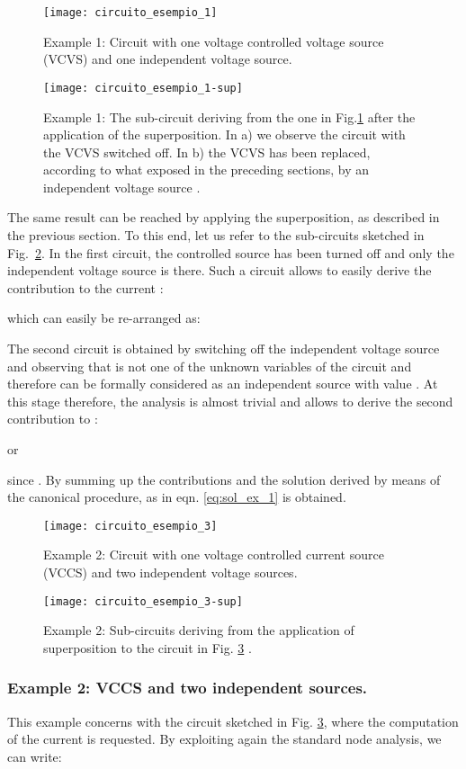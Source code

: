 \documentclass[10pt]{amsart}
\begin{document}
\begin{figure}[t]
\centering
\texttt{[image: circuito\_esempio\_1]}
\caption{Example 1: Circuit with one voltage controlled voltage source (VCVS) and one independent voltage source.}
\label{fig:VCVS}
\end{figure}
\begin{figure}[t]
\centering
\texttt{[image: circuito\_esempio\_1-sup]}
\caption{Example 1: The sub-circuit deriving from the one in Fig.\ref{fig:VCVS} after the application of the superposition. In a) we observe the circuit with the VCVS switched off. In b) the VCVS has been replaced, according to what exposed in the preceding sections, by an independent voltage source .}
\label{fig:VCVS-sub}
\end{figure}
The same result can be reached by applying the superposition, as described in the previous section. To this end, let us refer to the sub-circuits sketched in Fig.~\ref{fig:VCVS-sub}. In the first circuit, the controlled source has been turned off and only the independent voltage source is there. Such a circuit allows to easily derive the contribution to the current :

which can easily be re-arranged as:

The second circuit is obtained by switching off the independent voltage source and observing that  is not one of the unknown variables of the circuit and therefore can be formally considered as an independent source with value . At this stage therefore, the analysis is almost trivial and allows to derive the second contribution to :

or


since . By summing up the contributions  and  the solution derived by means of the canonical procedure, as in eqn. \eqref{eq:sol_ex_1} is obtained.



\begin{figure}[h]
\centering
\texttt{[image: circuito\_esempio\_3]}
\caption{Example 2: Circuit with one voltage controlled current source (VCCS) and two independent voltage sources.}
\label{fig:VCCS}
\end{figure}
\begin{figure}[h]
\centering
\texttt{[image: circuito\_esempio\_3-sup]}
\caption{Example 2: Sub-circuits deriving from the application of superposition to the circuit in Fig. \ref{fig:VCCS} .}
\label{fig:VCCS-sub}
\end{figure}
\subsubsection*{Example 2: VCCS and two independent sources.}
This example concerns with the circuit sketched in Fig. \ref{fig:VCCS}, where the computation of the current  is requested. By exploiting again the standard node analysis, we can write:
\end{document}
